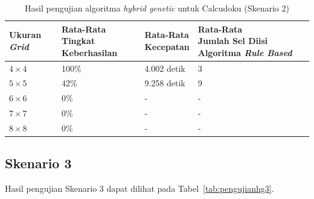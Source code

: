 \begin{table}
\centering
\captionsetup{justification=centering}
\caption[Hasil pengujian algoritma \textit{hybrid genetic} untuk Calcudoku (Skenario 2)]{Hasil pengujian algoritma \textit{hybrid genetic} untuk Calcudoku (Skenario 2)}
\begin{tabular}{| l | l | l | l |}
\hline
Ukuran \textit{Grid} & \makecell[l]{Rata-Rata \\ Tingkat Keberhasilan} & \makecell[l]{Rata-Rata \\ Kecepatan} & \makecell[l]{Rata-Rata \\ Jumlah Sel Diisi Algoritma \textit{Rule Based}} \\
\hline \hline
\begin{math}4 \times 4\end{math} & 100\% & 4.002 detik & 3 \\
\hline
\begin{math}5 \times 5\end{math} & 42\% & 9.258 detik & 9 \\
\hline
\begin{math}6 \times 6\end{math} & 0\% & - & - \\
\hline
\begin{math}7 \times 7\end{math} & 0\% & - & - \\
\hline
\begin{math}8 \times 8\end{math} & 0\% & - & - \\
\hline
\end{tabular}
\label{tab:pengujianhg2}
\end{table}

\subsection{Skenario 3}
\label{sec:skenario3}

Hasil pengujian Skenario 3 dapat dilihat pada Tabel~\ref{tab:pengujianhg3}.

